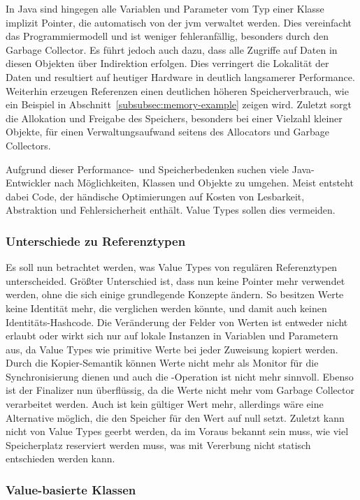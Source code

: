 In Java sind hingegen alle Variablen und Parameter vom Typ einer Klasse implizit Pointer, die automatisch von der \ac{jvm} verwaltet werden.
Dies vereinfacht das Programmiermodell und ist weniger fehleranfällig, besonders durch den Garbage Collector.
Es führt jedoch auch dazu, dass alle Zugriffe auf Daten in diesen Objekten über Indirektion erfolgen.
Dies verringert die Lokalität der Daten und resultiert auf heutiger Hardware in deutlich langsamerer Performance.
Weiterhin erzeugen Referenzen einen deutlichen höheren Speicherverbrauch, wie ein Beispiel in Abschnitt~\ref{subsubsec:memory-example} zeigen wird.
Zuletzt sorgt die Allokation und Freigabe des Speichers, besonders bei einer Vielzahl kleiner Objekte, für einen Verwaltungsaufwand seitens des Allocators und Garbage Collectors.

Aufgrund dieser Performance-\ und Speicherbedenken suchen viele Java-Entwickler nach Möglichkeiten, Klassen und Objekte zu umgehen.
Meist entsteht dabei Code, der händische Optimierungen auf Kosten von Lesbarkeit, Abstraktion und Fehlersicherheit enthält.
Value Types sollen dies vermeiden.

\subsubsection{Unterschiede zu Referenztypen}

Es soll nun betrachtet werden, was Value Types von regulären Referenztypen unterscheided.
Größter Unterschied ist, dass nun keine Pointer mehr verwendet werden, ohne die sich einige grundlegende Konzepte ändern.
So besitzen Werte keine Identität mehr, die verglichen werden könnte, und damit auch keinen Identitäts-Hashcode.
Die Veränderung der Felder von Werten ist entweder nicht erlaubt oder wirkt sich nur auf lokale Instanzen in Variablen und Parametern aus, da Value Types wie primitive Werte bei jeder Zuweisung kopiert werden.
Durch die Kopier-Semantik können Werte nicht mehr als Monitor für die Synchronisierung dienen und auch die -Operation ist nicht mehr sinnvoll.
Ebenso ist der Finalizer nun überflüssig, da die Werte nicht mehr vom Garbage Collector verarbeitet werden.
Auch  ist kein gültiger Wert mehr, allerdings wäre eine Alternative möglich, die den Speicher für den Wert auf null setzt.
Zuletzt kann nicht von Value Types geerbt werden, da im Voraus bekannt sein muss, wie viel Speicherplatz reserviert werden muss, was mit Vererbung nicht statisch entschieden werden kann.

\subsubsection{Value-basierte Klassen}

